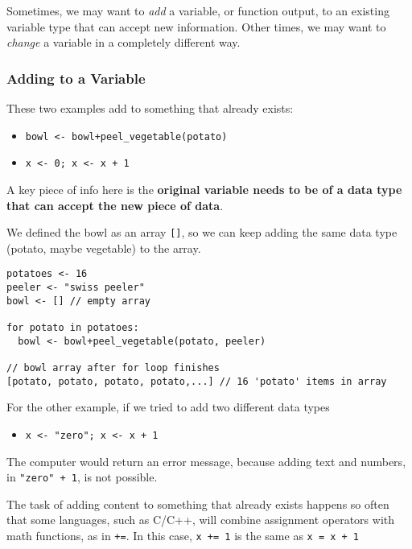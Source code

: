 \documentclass[
]{book}
\providecommand{\tightlist}{%
  \setlength{\itemsep}{0pt}\setlength{\parskip}{0pt}}
\begin{document}
Sometimes, we may want to \emph{add} a variable, or function output, to an existing variable type that can accept new information. Other times, we may want to \emph{change} a variable in a completely different way.

\subsubsection{Adding to a Variable}\label{adding-to-a-variable}

These two examples add to something that already exists:

\begin{itemize}
\tightlist
\item
  \texttt{bowl\ \textless{}-\ bowl+peel\_vegetable(potato)}
\item
  \texttt{x\ \textless{}-\ 0;\ x\ \textless{}-\ x\ +\ 1}
\end{itemize}

A key piece of info here is the \textbf{original variable needs to be of a data type that can accept the new piece of data}.~

We defined the bowl as an array \texttt{{[}{]}}, so we can keep adding the same data type (potato, maybe vegetable) to the array.~

\begin{verbatim}
potatoes <- 16
peeler <- "swiss peeler"
bowl <- [] // empty array

for potato in potatoes:
  bowl <- bowl+peel_vegetable(potato, peeler)

// bowl array after for loop finishes
[potato, potato, potato, potato,...] // 16 'potato' items in array
\end{verbatim}

For the other example, if we tried to add two different data types

\begin{itemize}
\tightlist
\item
  \texttt{x\ \textless{}-\ "zero";\ x\ \textless{}-\ x\ +\ 1}
\end{itemize}

The computer would return an error message, because adding text and numbers, in \texttt{"zero"\ +\ 1}, is not possible.

The task of adding content to something that already exists happens so often that some languages, such as C/C++, will combine assignment operators with math functions, as in \texttt{+=}. In this case, \texttt{x\ +=\ 1} is the same as \texttt{x\ =\ x\ +\ 1}
\end{document}
